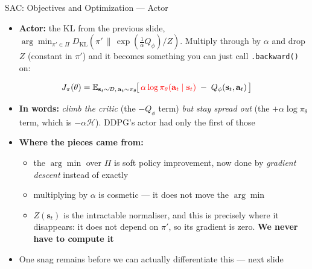 \begin{frame}{SAC: Objectives and Optimization --- Actor}
\small
\begin{itemize}
    \item \textbf{Actor:} the KL from the previous slide, $\displaystyle \arg\min_{\pi' \in \Pi} D_{\mathrm{KL}}\!\left( \pi' \,\big\|\, \exp(\tfrac{1}{\alpha} Q_\phi)/Z \right)$. Multiply through by $\alpha$ and drop $Z$ (constant in $\pi'$) and it becomes something you can just call \texttt{.backward()} on:
\end{itemize}
\[
J_\pi(\theta) = \mathbb{E}_{\mathbf{s}_t \sim \mathcal{D},\, \mathbf{a}_t \sim \pi_\theta}\!\big[\, \textcolor{red}{\alpha \log\pi_\theta(\mathbf{a}_t \mid \mathbf{s}_t)} \;-\; Q_\phi(\mathbf{s}_t, \mathbf{a}_t) \,\big]
\]
\vspace{-0.2em}
\begin{itemize}
    \item \textbf{In words:} \emph{climb the critic} (the $-Q_\phi$ term) \emph{but stay spread out} (the $+\alpha\log\pi_\theta$ term, which is $-\alpha\mathcal{H}$). DDPG's actor had only the first of those
    \vspace{0.4em}
    \item \textbf{Where the pieces came from:}
    \begin{itemize}
        \item the $\arg\min$ over $\Pi$ is soft policy improvement, now done by \emph{gradient descent} instead of exactly
        \item multiplying by $\alpha$ is cosmetic --- it does not move the $\arg\min$
        \item $Z(\mathbf{s}_t)$ is the intractable normaliser, and this is precisely where it disappears: it does not depend on $\pi'$, so its gradient is zero. \textbf{We never have to compute it}
    \end{itemize}
    \vspace{0.4em}
    \item[$\Rightarrow$] One snag remains before we can actually differentiate this --- next slide
\end{itemize}
\end{frame}

